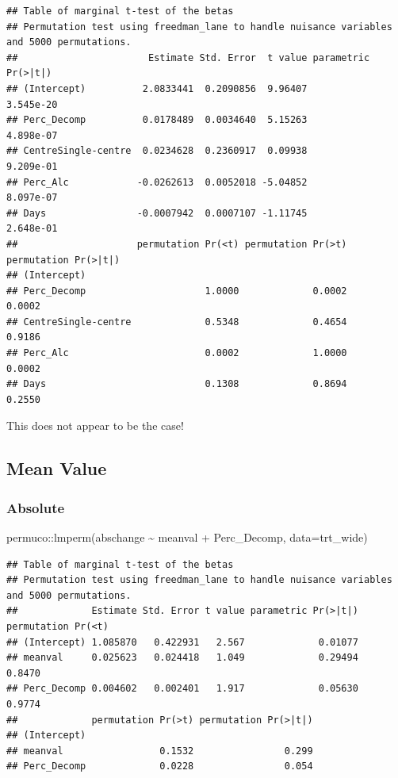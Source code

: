 \documentclass[
]{article}
\newenvironment{Shaded}{\begin{snugshade}}{\end{snugshade}}
\newcommand{\AttributeTok}[1]{\textcolor[rgb]{0.77,0.63,0.00}{#1}}
\newcommand{\FunctionTok}[1]{\textcolor[rgb]{0.00,0.00,0.00}{#1}}
\newcommand{\NormalTok}[1]{#1}
\newcommand{\SpecialCharTok}[1]{\textcolor[rgb]{0.00,0.00,0.00}{#1}}
\begin{document}
\begin{verbatim}
## Table of marginal t-test of the betas
## Permutation test using freedman_lane to handle nuisance variables and 5000 permutations.
##                       Estimate Std. Error  t value parametric Pr(>|t|)
## (Intercept)          2.0833441  0.2090856  9.96407           3.545e-20
## Perc_Decomp          0.0178489  0.0034640  5.15263           4.898e-07
## CentreSingle-centre  0.0234628  0.2360917  0.09938           9.209e-01
## Perc_Alc            -0.0262613  0.0052018 -5.04852           8.097e-07
## Days                -0.0007942  0.0007107 -1.11745           2.648e-01
##                     permutation Pr(<t) permutation Pr(>t) permutation Pr(>|t|)
## (Intercept)                                                                   
## Perc_Decomp                     1.0000             0.0002               0.0002
## CentreSingle-centre             0.5348             0.4654               0.9186
## Perc_Alc                        0.0002             1.0000               0.0002
## Days                            0.1308             0.8694               0.2550
\end{verbatim}

This does not appear to be the case!

\hypertarget{mean-value}{%
\subsection{Mean Value}\label{mean-value}}

\hypertarget{absolute-2}{%
\subsubsection{Absolute}\label{absolute-2}}

\begin{Shaded}
\begin{Highlighting}[]
\NormalTok{permuco}\SpecialCharTok{::}\FunctionTok{lmperm}\NormalTok{(abschange }\SpecialCharTok{\textasciitilde{}}\NormalTok{ meanval }\SpecialCharTok{+}\NormalTok{ Perc\_Decomp, }\AttributeTok{data=}\NormalTok{trt\_wide)}
\end{Highlighting}
\end{Shaded}

\begin{verbatim}
## Table of marginal t-test of the betas
## Permutation test using freedman_lane to handle nuisance variables and 5000 permutations.
##             Estimate Std. Error t value parametric Pr(>|t|) permutation Pr(<t)
## (Intercept) 1.085870   0.422931   2.567             0.01077                   
## meanval     0.025623   0.024418   1.049             0.29494             0.8470
## Perc_Decomp 0.004602   0.002401   1.917             0.05630             0.9774
##             permutation Pr(>t) permutation Pr(>|t|)
## (Intercept)                                        
## meanval                 0.1532                0.299
## Perc_Decomp             0.0228                0.054
\end{verbatim}
\end{document}
